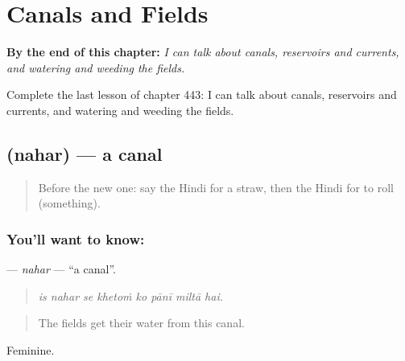 
\chapter{Canals and Fields}
\label{ch:hi-canals-and-fields}

\begin{chapteropening}
\textbf{By the end of this chapter:} \emph{I can talk about canals, reservoirs and currents, and watering and weeding the fields.}

Complete the last lesson of chapter 443: I can talk about canals, reservoirs and currents, and watering and weeding the fields.
\end{chapteropening}

\section[\texorpdfstring{\hi{नहर} (nahar)}{नहर (nahar)}]{ (nahar) — a canal}

\label{lesson:HI-C443-nahar}



\begin{quote}
Before the new one: say the Hindi for a straw, then the Hindi for to roll (something).
\end{quote}

\subsection*{You'll want to know: }
\textbf{} — \emph{nahar} — \textquotedblleft{}a canal\textquotedblright{}.

\begin{quote}
       
\end{quote}

\begin{quote}
\emph{is nahar se khetoṁ ko pānī miltā hai.}
\end{quote}

\begin{quote}
The fields get their water from this canal.
\end{quote}

Feminine.


